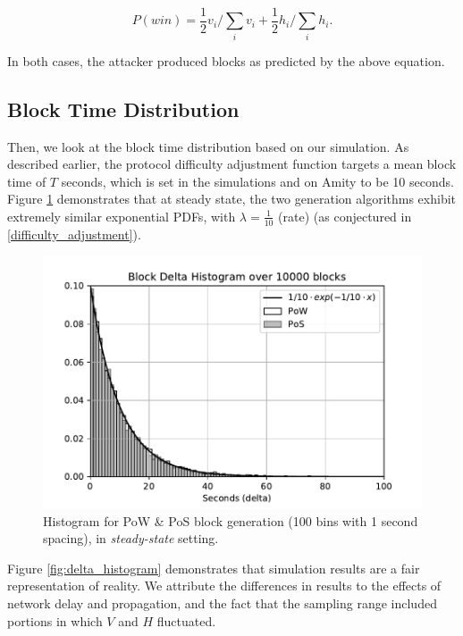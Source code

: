 \begin{equation}
    P(win) = \frac{1}{2}v_i/\sum_i{v_i} + \frac{1}{2}h_i/\sum_i{h_i}.
\end{equation}

In both cases, the attacker produced blocks as predicted by the above equation.

\subsection{Block Time Distribution}

Then, we look at the block time distribution based on our simulation. As described earlier, the protocol
difficulty adjustment function targets a mean block time of $T$ seconds, which is set in the simulations
and on Amity to be 10 seconds. Figure \ref{fig:pos_pow_delta_histogram} demonstrates that at steady state, the two generation algorithms exhibit extremely similar exponential PDFs, with $\lambda = \frac{1}{10}$ (rate) (as conjectured in \ref{difficulty_adjustment}). 

\begin{figure}[h]
    \centering
    \includegraphics[width=0.55\linewidth]{assets/sim_results/block_delta_histogram_steady_state.pdf}
    \caption{Histogram for PoW \& PoS block generation (100 bins with 1 second spacing), in \textit{steady-state} setting.}
    \label{fig:pos_pow_delta_histogram}
\end{figure}


Figure \ref{fig:delta_histogram} demonstrates that simulation results are a fair representation of reality. We attribute the differences in results to the effects of network delay and propagation, and the fact that the sampling range included portions in which $V$ and $H$ fluctuated.

